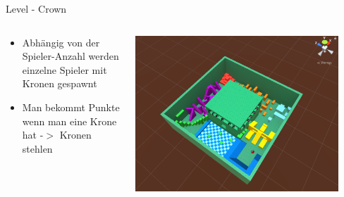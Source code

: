 \documentclass[xcolor=dvipsnames]{beamer}
\begin{document}
\begin{frame}{Level - Crown}
\begin{columns}
\begin{column}{0.5\textwidth}
	\begin{itemize}
		\item Abhängig von der Spieler-Anzahl werden einzelne Spieler mit Kronen gespawnt 
		\item Man bekommt Punkte wenn man eine Krone hat -$>$ Kronen stehlen
	\end{itemize}
\end{column}
\begin{column}{0.5\textwidth} 
	\begin{center}
		\includegraphics[width=0.9\textwidth]{Level_Crown_view.png}
	\end{center}
\end{column}
\end{columns}

\end{frame}
\end{document}
